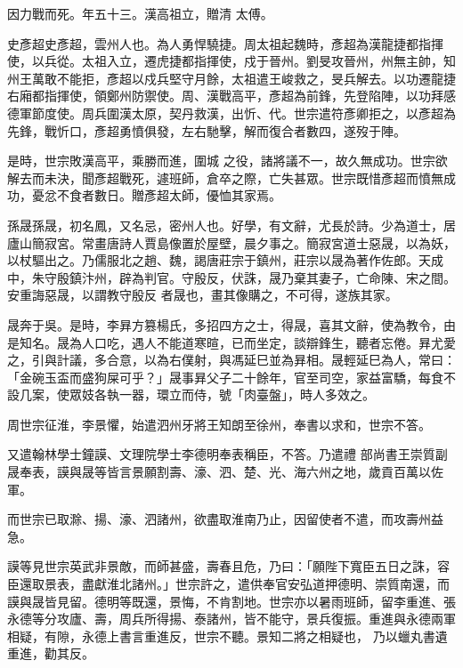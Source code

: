 \begin{pinyinscope}
 因力戰而死。年五十三。漢高祖立，贈清
 太傅。



 史彥超史彥超，雲州人也。為人勇悍驍捷。周太祖起魏時，彥超為漢龍捷都指揮使，以兵從。太祖入立，遷虎捷都指揮使，戍于晉州。劉旻攻晉州，州無主帥，知州王萬敢不能拒，彥超以戍兵堅守月餘，太祖遣王峻救之，旻兵解去。以功遷龍捷右廂都指揮使，領鄭州防禦使。周、漢戰高平，彥超為前鋒，先登陷陣，以功拜感德軍節度使。周兵圍漢太原，契丹救漢，出忻、代。世宗遣符彥卿拒之，以彥超為先鋒，戰忻口，彥超勇憤俱發，左右馳擊，解而復合者數四，遂歿于陣。



 是時，世宗敗漢高平，乘勝而進，圍城
 之役，諸將議不一，故久無成功。世宗欲解去而未決，聞彥超戰死，遽班師，倉卒之際，亡失甚眾。世宗既惜彥超而憤無成功，憂忿不食者數日。贈彥超太師，優恤其家焉。



 孫晟孫晟，初名鳳，又名忌，密州人也。好學，有文辭，尤長於詩。少為道士，居廬山簡寂宮。常畫唐詩人賈島像置於屋壁，晨夕事之。簡寂宮道士惡晟，以為妖，以杖驅出之。乃儒服北之趙、魏，謁唐莊宗于鎮州，莊宗以晟為著作佐郎。天成中，朱守殷鎮汴州，辟為判官。守殷反，伏誅，晟乃棄其妻子，亡命陳、宋之間。安重誨惡晟，以謂教守殷反
 者晟也，畫其像購之，不可得，遂族其家。



 晟奔于吳。是時，李昪方篡楊氏，多招四方之士，得晟，喜其文辭，使為教令，由是知名。晟為人口吃，遇人不能道寒暄，已而坐定，談辯鋒生，聽者忘倦。昪尤愛之，引與計議，多合意，以為右僕射，與馮延巳並為昪相。晟輕延巳為人，常曰：「金碗玉盃而盛狗屎可乎？」晟事昪父子二十餘年，官至司空，家益富驕，每食不設几案，使眾妓各執一器，環立而侍，號「肉臺盤」，時人多效之。



 周世宗征淮，李景懼，始遣泗州牙將王知朗至徐州，奉書以求和，世宗不答。



 又遣翰林學士鐘謨、文理院學士李德明奉表稱臣，不答。乃遣禮
 部尚書王崇質副晟奉表，謨與晟等皆言景願割壽、濠、泗、楚、光、海六州之地，歲貢百萬以佐軍。



 而世宗已取滁、揚、濠、泗諸州，欲盡取淮南乃止，因留使者不遣，而攻壽州益急。



 謨等見世宗英武非景敵，而師甚盛，壽春且危，乃曰：「願陛下寬臣五日之誅，容臣還取景表，盡獻淮北諸州。」世宗許之，遣供奉官安弘道押德明、崇質南還，而謨與晟皆見留。德明等既還，景悔，不肯割地。世宗亦以暑雨班師，留李重進、張永德等分攻廬、壽，周兵所得揚、泰諸州，皆不能守，景兵復振。重進與永德兩軍相疑，有隙，永德上書言重進反，世宗不聽。景知二將之相疑也，
 乃以蠟丸書遺重進，勸其反。




\end{pinyinscope}
